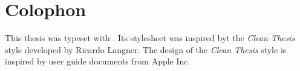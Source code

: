 %
\pagestyle{empty}
\hfill
\vfill
{}
\section*{Colophon}

This thesis was typeset with \LaTeXe.
Its stylesheet was inspired byt the \textit{Clean Thesis} style developed by Ricardo Langner.
The design of the \textit{Clean Thesis} style is inspired by user guide documents from Apple Inc.